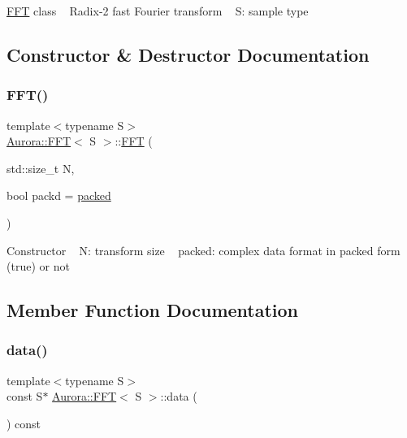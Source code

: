 \hyperlink{class_aurora_1_1_f_f_t}{F\+FT} class ~\newline
Radix-\/2 fast Fourier transform ~\newline
S\+: sample type 

\subsection{Constructor \& Destructor Documentation}
\mbox{\label{class_aurora_1_1_f_f_t_a89e14a054e328bd8a0d477691f690135}} 
\subsubsection{\texorpdfstring{F\+F\+T()}{FFT()}}
{\footnotesize\ttfamily template$<$typename S$>$ \\
\hyperlink{class_aurora_1_1_f_f_t}{Aurora\+::\+F\+FT}$<$ S $>$\+::\hyperlink{class_aurora_1_1_f_f_t}{F\+FT} (\begin{DoxyParamCaption}\item[{std\+::size\+\_\+t}]{N,  }\item[{bool}]{packd = {\ttfamily \hyperlink{namespace_aurora_a3e70ffc9ea5c526dcd66b1b14e43f175}{packed}} }\end{DoxyParamCaption})\hspace{0.3cm}{\ttfamily [inline]}}

Constructor ~\newline
N\+: transform size ~\newline
packed\+: complex data format in packed form (true) or not 

\subsection{Member Function Documentation}
\mbox{\label{class_aurora_1_1_f_f_t_a7462e77c06228475f0f491d7a25d7bba}} 
\subsubsection{\texorpdfstring{data()}{data()}}
{\footnotesize\ttfamily template$<$typename S$>$ \\
const S$\ast$ \hyperlink{class_aurora_1_1_f_f_t}{Aurora\+::\+F\+FT}$<$ S $>$\+::data (\begin{DoxyParamCaption}{ }\end{DoxyParamCaption}) const\hspace{0.3cm}{\ttfamily [inline]}}

